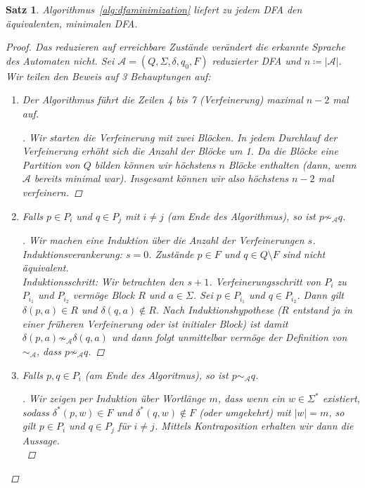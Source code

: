 \documentclass[11pt, a4paper]{article}
\theoremstyle{definition}
\theoremstyle{plain}
\newtheorem{theorem}[definition]{Satz}
\numberwithin{equation}{section}
\newenvironment{subproof}[1][\proofname]{\renewcommand{\qedsymbol}{$\blacksquare$}\vspace{-3ex}\begin{proof}[#1]}{\end{proof}\vspace{-3ex}}
\begin{document}
\begin{theorem}
	Algorithmus~\ref{alg:dfaminimization} liefert zu jedem DFA den äquivalenten, minimalen DFA.
	\begin{proof}
		Das reduzieren auf erreichbare Zustände verändert die erkannte Sprache des Automaten nicht. Sei $\mathcal{A} = (Q, \Sigma, \delta, q_0, F)$ reduzierter DFA und $n \coloneqq |\mathcal{A}|$.
		Wir teilen den Beweis auf 3 Behauptungen auf:
		\begin{enumerate}
			\item Der Algorithmus führt die Zeilen 4 bis 7 (Verfeinerung) maximal $n-2$ mal auf. 
				\begin{subproof}
					Wir starten die Verfeinerung mit zwei Blöcken. In jedem Durchlauf der Verfeinerung erhöht sich die Anzahl der Blöcke um 1. Da die Blöcke eine Partition von $Q$ bilden können wir höchstens $n$ Blöcke enthalten (dann, wenn $\mathcal{A}$ bereits minimal war). Insgesamt können wir also höchstens $n-2$ mal verfeinern.
				\end{subproof}
			\item Falls $p \in P_i$ und $q \in P_j$ mit $i \neq j$ (am Ende des Algorithmus), so ist $p \not\sim_\mathcal{A} q$.
				\begin{subproof}
					Wir machen eine Induktion über die Anzahl der Verfeinerungen $s$.\\
					Induktionsverankerung: $s = 0$. Zustände $p \in F$ und $q \in Q \setminus F$ sind nicht äquivalent.\checkmark\\
					Induktionsschritt: Wir betrachten den $s+1$. Verfeinerungsschritt von $P_i$ zu $P_{i_1}$ und $P_{i_2}$ vermöge Block $R$ und $a \in \Sigma$. Sei $p \in P_{i_1}$ und $q \in P_{i_2}$. Dann gilt $\delta(p, a) \in R$ und $\delta(q, a) \notin R$. Nach Induktionshypothese ($R$ entstand ja in einer früheren Verfeinerung oder ist initialer Block) ist damit $\delta(p, a) \not\sim_\mathcal{A} \delta(q, a)$ und dann folgt unmittelbar vermöge der Definition von $\sim_\mathcal{A}$, dass $p \not\sim_\mathcal{A} q$.
				\end{subproof}
			\item Falls $p, q \in P_i$ (am Ende des Algoritmus), so ist $p \sim_\mathcal{A} q$.
				\begin{subproof}
					Wir zeigen per Induktion über Wortlänge $m$, dass wenn ein $w \in \Sigma^\ast$ existiert, sodass $\delta^\ast(p, w) \in F$ und $\delta^\ast(q, w) \notin F$ (oder umgekehrt) mit $|w| = m$, so gilt $p \in P_i$ und $q \in P_j$ für $i \neq j$. Mittels Kontraposition erhalten wir dann die Aussage.\\

\end{subproof}
\end{enumerate}
\end{proof}
\end{theorem}
\end{document}
